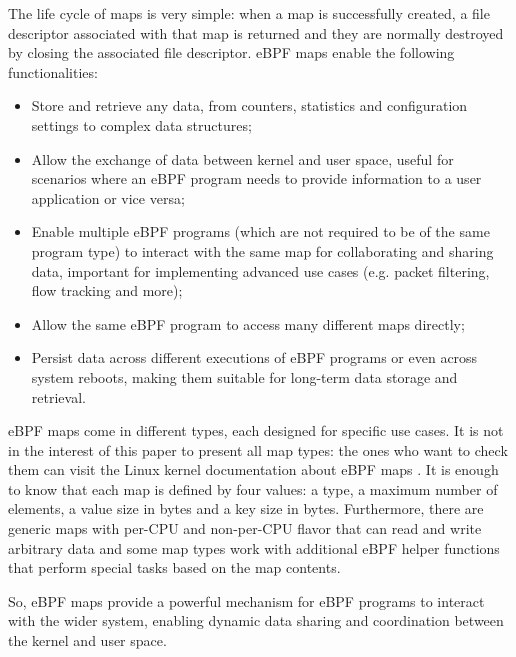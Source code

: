 The life cycle of maps is very simple: when a map is successfully created, a file descriptor associated with that map is returned and they are normally destroyed by closing the associated file descriptor.
eBPF maps enable the following functionalities:

\begin{itemize}
	\item Store and retrieve any data, from counters, statistics and configuration
		settings to complex data structures;
	\item Allow the exchange of data between kernel and user space, useful for
		scenarios where an eBPF program needs to provide information to a user application or vice versa;
	\item Enable multiple eBPF programs (which are not required to be of the same
		program type) to interact with the same map for collaborating and sharing data, important for implementing advanced use cases (e.g. packet filtering, flow tracking and more); 
	\item Allow the same eBPF program to access many different maps directly;
	\item Persist data across different executions of eBPF programs or even across
		system reboots, making them suitable for long-term data storage and retrieval.
\end{itemize}

eBPF maps come in different types, each designed for specific use cases.
It is not in the interest of this paper to present all map types: the ones who want to check them can visit the Linux kernel documentation about eBPF maps \cite{eBPFLinuxMaps}.
It is enough to know that each map is defined by four values: a type, a maximum number of elements, a value size in bytes and a key size in bytes.
Furthermore, there are generic maps with per-CPU and non-per-CPU flavor that can read and write arbitrary data and some map types work with additional eBPF helper functions that perform special tasks based on the map contents.

So, eBPF maps provide a powerful mechanism for eBPF programs to interact with the wider system, enabling dynamic data sharing and coordination between the kernel and user space.

